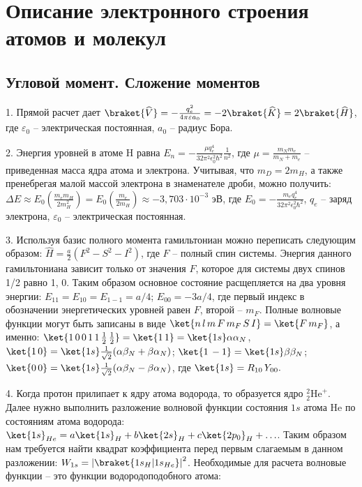 \setmainfont{Noto Serif}
\setsansfont{Noto Sans}
\setmonofont{Noto Sans Mono}


\section{Описание электронного строения атомов и молекул}
\subsection{Угловой момент. Сложение моментов}
1. Прямой расчет дает $\braket{\widehat{V}}= -\frac{q_e^2}{4\pi \varepsilon a_0}=-2\braket{ \widehat{K}}=2\braket {\widehat{H}}$, где $\varepsilon_0$ – электрическая постоянная, $a_0$ – радиус Бора. \par
2. Энергия уровней в атоме H равна $E_n = -\frac{\mu q_e^4}{32 \pi^2 \epsilon_0^2 \hbar^2}\frac{1}{n^2}$, где $\mu=\frac{m_N m_e}{m_N + m_e}$ – приведенная масса ядра атома и электрона. Учитывая, что $m_D = 2m_H$, а также пренебрегая малой массой электрона в знаменателе дроби, можно получить: $\Delta E \approx E_0 ( \frac{m_em_H}{2m_H^2} ) = E_0 (\frac{m_e}{2m_H}) \approx -3,703\cdot 10^{-3}$ эВ, где $E_0 = -\frac{ m_e q_e^4}{32 \pi^2 \epsilon_0^2 \hbar^2}$, $q_e$ – заряд электрона, $\varepsilon_0$ – электрическая постоянная.\par
3. Используя базис полного момента гамильтониан можно переписать следующим образом: $\widehat{H}=\frac{a}{2}( {F}^2 -{S}^2-{I}^2)$, где $F$ – полный спин системы. Энергия данного гамильтониана зависит только от значения $F$, которое для системы двух спинов 1/2 равно 1, 0. Таким образом основное состояние расщепляется на два уровня энергии: $E_{11}=E_{10}=E_{1-1}=a/4$; $E_{00}=-3a/4$, где первый индекс в обозначении энергетических уровней равен $F$, второй – $m_F$. Полные волновые функции могут быть записаны в виде $\ket {n\,l\,m\,F\,m_F\,S\,I}=\ket{F\,m_F}$, а именно: $\ket{ 1\, 0\, 0\,  1\, 1\, \frac{1}{2}\, \frac{1}{2}} = \ket{1\,1} = \ket{1s}\alpha{\alpha}_N$, $\ket{1\,0} = \ket{1s}\frac{1}{\sqrt{2}}(\alpha{\beta}_N +{\beta}{\alpha}_N)$; $\ket{1\,-1} = \ket{1s}\beta{\beta}_N$; $\ket{0\,0} = \ket{1s}\frac{1}{\sqrt{2}}(\alpha{\beta}_N - {\beta}{\alpha}_N)$, где $\ket{1s} = R_{10}\textit{Y}_{00}.$\par
4. Когда протон прилипает к ядру атома водорода, то образуется ядро $^2_2\text{He}^+$. Далее нужно выполнить разложение волновой функции состояния $1s$ атома He по состояниям атома водорода: $\ket{1s}_{He} = a\ket{1s}_{H} + b\ket{2s}_H + c\ket{2p_0}_H + \ldots$. Таким образом нам требуется найти квадрат коэффициента перед первым слагаемым в данном разложении: $W_{1s}={|\braket{1s_H|1s_{He}}|}^2$. Необходимые для расчета волновые функции – это функции водородоподобного атома:\par
